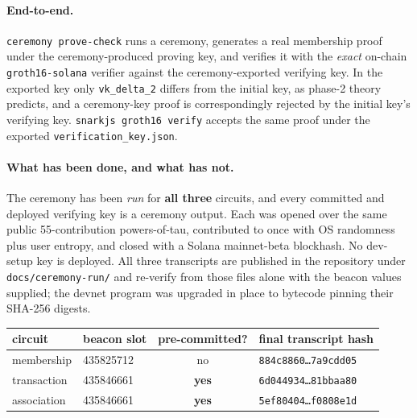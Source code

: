 \documentclass[10pt]{article}
\newcommand{\code}[1]{\texttt{#1}}
\begin{document}
\paragraph{End-to-end.} \code{ceremony prove-check} runs a ceremony, generates a real
membership proof under the ceremony-produced proving key, and verifies it with the
\emph{exact} on-chain \code{groth16-solana} verifier against the ceremony-exported
verifying key. In the exported key only \code{vk\_delta\_2} differs from the initial
key, as phase-2 theory predicts, and a ceremony-key proof is correspondingly rejected
by the initial key's verifying key. \code{snarkjs groth16 verify} accepts the same proof under
the exported \code{verification\_key.json}.

\paragraph{What has been done, and what has not.} The ceremony has been \emph{run}
for \textbf{all three} circuits, and every committed and deployed verifying key is
a ceremony output. Each was opened over the same public 55-contribution
powers-of-tau, contributed to once with OS randomness plus user entropy, and closed
with a Solana mainnet-beta blockhash. No dev-setup key is deployed. All three
transcripts are published in the repository under \code{docs/ceremony-run/} and
re-verify from those files alone with the beacon values supplied; the devnet program
was upgraded in place to bytecode pinning their SHA-256 digests.

\begin{center}
\small
\begin{tabular}{@{}llcl@{}}
\toprule
\textbf{circuit} & \textbf{beacon slot} & \textbf{pre-committed?} & \textbf{final transcript hash} \\
\midrule
membership  & 435825712 & no  & \code{884c8860\ldots 7a9cdd05} \\
transaction & 435846661 & \textbf{yes} & \code{6d044934\ldots 81bbaa80} \\
association & 435846661 & \textbf{yes} & \code{5ef80404\ldots f0808e1d} \\
\bottomrule
\end{tabular}
\end{center}
\end{document}

